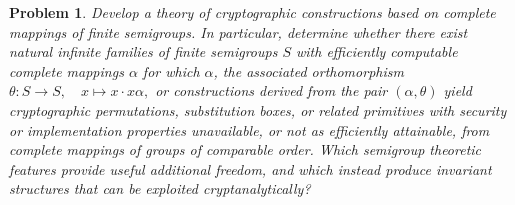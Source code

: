 \documentclass[11pt]{article}
\theoremstyle{plain}
\newtheorem{problem}{Problem}[section]
\theoremstyle{remark}
\theoremstyle{definition}
\theoremstyle{plain}
\begin{document}
\begin{problem}
Develop a theory of cryptographic constructions based on complete mappings
of finite semigroups.  In particular, determine whether there exist natural
infinite families of finite semigroups $S$ with efficiently computable
complete mappings $\alpha$ for which $\alpha$, the associated orthomorphism
\(\theta:S\to S,\quad x\mapsto x\cdot x\alpha,\)
or constructions derived from the pair $(\alpha,\theta)$ yield
cryptographic permutations, substitution boxes, or related primitives with
security or implementation properties unavailable, or not as efficiently
attainable, from complete mappings of groups of comparable order.  Which
semigroup theoretic features provide useful additional freedom, and which
instead produce invariant structures that can be exploited
cryptanalytically?
\end{problem}
\end{document}

